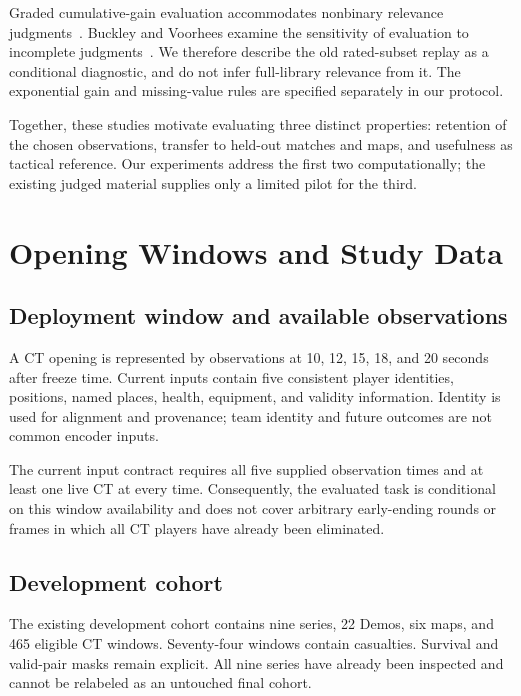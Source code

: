 Graded cumulative-gain evaluation accommodates nonbinary relevance judgments~\cite{jarvelin2002gain}. Buckley and Voorhees examine the sensitivity of evaluation to incomplete judgments~\cite{buckley2004incomplete}. We therefore describe the old rated-subset replay as a conditional diagnostic, and do not infer full-library relevance from it. The exponential gain and missing-value rules are specified separately in our protocol. %

Together, these studies motivate evaluating three distinct properties: retention of the chosen observations, transfer to held-out matches and maps, and usefulness as tactical reference. Our experiments address the first two computationally; the existing judged material supplies only a limited pilot for the third.

\section{Opening Windows and Study Data}
\subsection{Deployment window and available observations}
A CT opening is represented by observations at 10, 12, 15, 18, and 20 seconds after freeze time. Current inputs contain five consistent player identities, positions, named places, health, equipment, and validity information. Identity is used for alignment and provenance; team identity and future outcomes are not common encoder inputs.

The current input contract requires all five supplied observation times and at least one live CT at every time. Consequently, the evaluated task is conditional on this window availability and does not cover arbitrary early-ending rounds or frames in which all CT players have already been eliminated. %

\subsection{Development cohort}
The existing development cohort contains nine series, 22 Demos, six maps, and 465 eligible CT windows. Seventy-four windows contain casualties. Survival and valid-pair masks remain explicit. All nine series have already been inspected and cannot be relabeled as an untouched final cohort.

